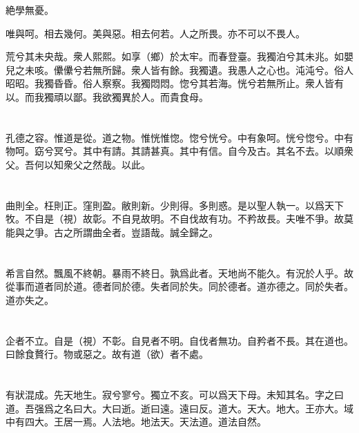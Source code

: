 \documentclass[a5paper]{ctexbook}
\begin{document}
    絶學無憂。
    
    唯與呵。相去幾何。美與惡。相去何若。人之所畏。亦不可以不畏人。
    
    荒兮其未央哉。衆人熙熙。如享（鄉）於太牢。而春登臺。我獨泊兮其未兆。如嬰兒之未咳。儽儽兮若無所歸。衆人皆有餘。我獨遺。我愚人之心也。沌沌兮。俗人昭昭。我獨昏昏。俗人察察。我獨悶悶。惚兮其若海。恍兮若無所止。衆人皆有以。而我獨頑以鄙。我欲獨異於人。而貴食母。

    \chapter{}

    孔德之容。惟道是從。道之物。惟恍惟惚。惚兮恍兮。中有象呵。恍兮惚兮。中有物呵。窈兮冥兮。其中有請。其請甚真。其中有信。自今及古。其名不去。以順衆父。吾何以知衆父之然哉。以此。

    \chapter{}

    曲則全。枉則正。窪則盈。敝則新。少則得。多則惑。是以聖人執一。以爲天下牧。不自是（視）故彰。不自見故明。不自伐故有功。不矜故長。夫唯不爭。故莫能與之爭。古之所謂曲全者。豈語哉。誠全歸之。

    \chapter{}

    希言自然。飄風不終朝。暴雨不終日。孰爲此者。天地尚不能久。有況於人乎。故從事而道者同於道。德者同於德。失者同於失。同於德者。道亦德之。同於失者。道亦失之。

    \chapter{}

    企者不立。自是（視）不彰。自見者不明。自伐者無功。自矜者不長。其在道也。曰餘食贅行。物或惡之。故有道（欲）者不處。

    \chapter{}

    有狀混成。先天地生。寂兮寥兮。獨立不亥。可以爲天下母。未知其名。字之曰道。吾强爲之名曰大。大曰逝。逝曰遠。遠曰反。道大。天大。地大。王亦大。域中有四大。王居一焉。人法地。地法天。天法道。道法自然。
\end{document}
